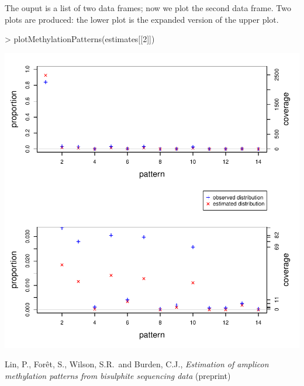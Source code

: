 \documentclass[12pt]{article}
\begin{document}
The ouput is a list of two data frames;
now we plot the second data frame.
Two plots are produced: the lower plot is the expanded version of the upper plot.


\begin{Schunk}
\begin{Sinput}
> plotMethylationPatterns(estimates[[2]])
\end{Sinput}
\end{Schunk}
\includegraphics{vignette-003}

\begin{thebibliography}{}
Lin, P., For\^et, S., Wilson, S.R.\ and Burden, C.J., {\it Estimation of amplicon methylation patterns from bisulphite sequencing data} (preprint)
\end{thebibliography}
\end{document}
